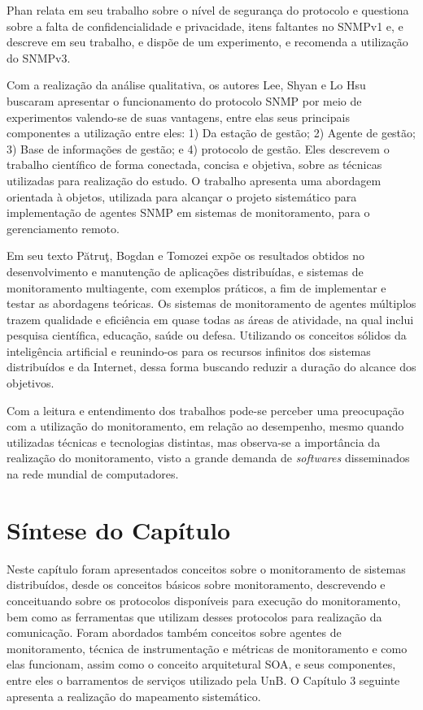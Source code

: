Phan \cite{phan2009cryptanalysis} relata em seu trabalho sobre o nível de segurança do protocolo e questiona sobre a falta de confidencialidade e privacidade, itens faltantes no SNMPv1 e, e descreve em seu trabalho, e dispõe de um experimento, e recomenda a utilização do SNMPv3.

Com a realização da análise qualitativa, os autores Lee, Shyan e Lo Hsu \cite{lee2004design} buscaram apresentar o funcionamento do protocolo SNMP por meio de experimentos valendo-se de suas vantagens, entre elas seus principais componentes a utilização entre eles: 1) Da estação de gestão; 2) Agente de gestão; 3) Base de informações de gestão; e 4) protocolo de gestão. Eles descrevem o trabalho científico de forma conectada, concisa e objetiva, sobre as técnicas utilizadas para realização do estudo. O trabalho apresenta uma abordagem orientada à objetos, utilizada para alcançar o projeto sistemático para implementação de agentes SNMP em sistemas de monitoramento, para o gerenciamento remoto.

Em seu texto Pătruţ, Bogdan e Tomozei \cite{puatruct2010agent} expõe os resultados obtidos no desenvolvimento e manutenção de aplicações distribuídas, e sistemas de monitoramento multiagente, com exemplos práticos, a fim de implementar e testar as abordagens teóricas. Os sistemas de monitoramento de agentes múltiplos trazem qualidade e eficiência em quase todas as áreas de atividade, na qual inclui pesquisa científica, educação, saúde ou defesa.
Utilizando os conceitos sólidos da inteligência artificial e reunindo-os para os recursos infinitos dos sistemas distribuídos e da Internet, dessa forma buscando reduzir a duração do alcance dos objetivos.

Com a leitura e entendimento dos trabalhos pode-se perceber uma preocupação com a utilização do monitoramento, em relação ao desempenho, mesmo quando utilizadas técnicas e tecnologias distintas, mas observa-se a importância da realização do monitoramento, visto a grande demanda de \textit{softwares} disseminados na rede mundial de computadores.


\section{Síntese do Capítulo}

Neste capítulo foram apresentados conceitos sobre o monitoramento de sistemas distribuídos, desde os conceitos básicos sobre monitoramento, descrevendo e conceituando sobre os protocolos disponíveis para execução do monitoramento, bem como as ferramentas que utilizam desses protocolos para realização da comunicação. Foram abordados também conceitos sobre agentes de monitoramento, técnica  de instrumentação e métricas de monitoramento e como elas funcionam, assim como o conceito arquitetural \acrshort{SOA}, e seus componentes, entre eles o barramentos de serviços utilizado pela \acrshort{UnB}. O Capítulo 3 seguinte apresenta a realização do mapeamento sistemático.


